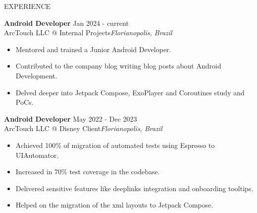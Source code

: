 \begin{rSection}{EXPERIENCE}

    \textbf{Android Developer} \hfill Jan 2024 - current\\
    ArcTouch LLC @ Internal Projects\hfill \textit{Florianopolis, Brazil}
    \begin{itemize}
        \itemsep -3pt {} 
        \item Mentored and trained a Junior Android Developer.
        \item Contributed to the company blog writing blog posts about Android Development.
        \item Delved deeper into Jetpack Compose, ExoPlayer and Coroutines study and PoCs.
    \end{itemize}

    \textbf{Android Developer} \hfill May 2022 - Dec 2023\\
    ArcTouch LLC @ Disney Client\hfill \textit{Florianopolis, Brazil}
    \begin{itemize}
        \itemsep -3pt {} 
        \item Achieved 100\% of migration of automated tests using Espresso to UIAutomator.
        \item Increased in 70\% test coverage in the codebase. 
        \item Delivered sensitive features like deeplinks integration and onboarding tooltips.
        \item Helped on the migration of the xml layouts to Jetpack Compose.
    \end{itemize}
    

\end{rSection}
